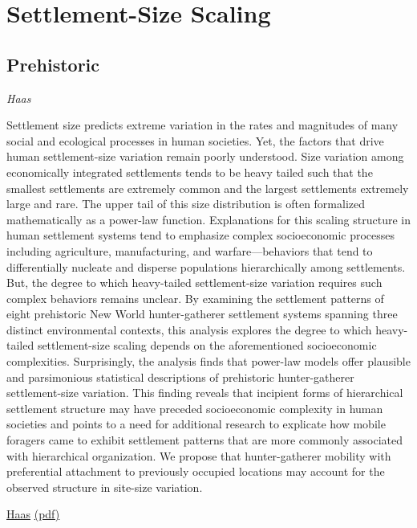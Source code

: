 \documentclass[
]{book}
\begin{document}
\hypertarget{settlement-size-scaling}{%
\section{Settlement-Size Scaling}\label{settlement-size-scaling}}

\hypertarget{prehistoric}{%
\subsection{Prehistoric}\label{prehistoric}}

\emph{Haas}

Settlement size predicts extreme variation in the rates and magnitudes of many social and ecological processes in human societies. Yet, the factors that drive human settlement-size variation remain poorly understood. Size variation among economically integrated settlements tends to be heavy tailed such that the smallest settlements are extremely common and the largest settlements extremely large and rare. The upper tail of this size distribution is often formalized mathematically as a power-law function. Explanations for this scaling structure in human settlement systems tend to emphasize complex socioeconomic processes including agriculture, manufacturing, and warfare---behaviors that tend to differentially nucleate and disperse populations hierarchically among settlements. But, the degree to which heavy-tailed settlement-size variation requires such complex behaviors remains unclear. By examining the settlement patterns of eight prehistoric New World hunter-gatherer settlement systems spanning three distinct environmental contexts, this analysis explores the degree to which heavy-tailed settlement-size scaling depends on the aforementioned socioeconomic complexities. Surprisingly, the analysis finds that power-law models offer plausible and parsimonious statistical descriptions of prehistoric hunter-gatherer settlement-size variation. This finding reveals that incipient forms of hierarchical settlement structure may have preceded socioeconomic complexity in human societies and points to a need for additional research to explicate how mobile foragers came to exhibit settlement patterns that are more commonly associated with hierarchical organization. We propose that hunter-gatherer mobility with preferential attachment to previously occupied locations may account for the observed structure in site-size variation.

\href{https://journals.plos.org/plosone/article?id=10.1371/journal.pone.0140127}{Haas}
\href{pdf/Haas_2015_Prehistoric_Settlement_Size_Scaling.pdf}{(pdf)}
\end{document}
